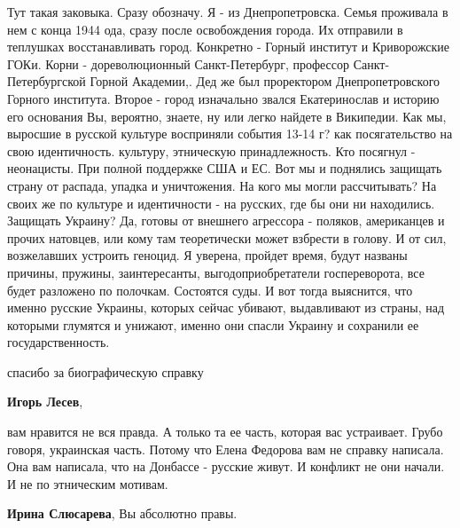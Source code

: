 \begin{itemize}
Тут такая заковыка. Сразу обозначу. Я - из Днепропетровска. Семья проживала в
нем с конца 1944 ода, сразу после освобождения города. Их отправили в теплушках
восстанавливать город. Конкретно - Горный институт и Криворожские ГОКи. Корни -
дореволюционный Санкт-Петербург, профессор Санкт-Петербургской Горной
Академии,. Дед же был проректором Днепропетровского Горного института. Второе -
город изначально звался Екатеринослав и историю его основания Вы, вероятно,
знаете, ну или легко найдете в Википедии. Как мы, выросшие в русской культуре
восприняли события 13-14 г? как посягательство на свою идентичность. культуру,
этническую принадлежность. Кто посягнул - неонацисты. При полной поддержке США
и ЕС. Вот мы и поднялись защищать страну от распада, упадка и уничтожения. На
кого мы могли рассчитывать? На своих же по культуре и идентичности - на
русских, где бы они ни находились. Защищать Украину? Да, готовы от внешнего
агрессора - поляков, американцев и прочих натовцев, или кому там теоретически
может взбрести в голову. И от сил, возжелавших устроить геноцид. Я уверена,
пройдет время, будут названы причины, пружины, заинтересанты,
выгодоприобретатели госпереворота, все будет разложено по полочкам. Состоятся
суды. И вот тогда выяснится, что именно русские Украины, которых сейчас
убивают, выдавливают из страны, над которыми глумятся и унижают, именно они
спасли Украину и сохранили ее государственность.

\begin{itemize} %
спасибо за биографическую справку

\textbf{Игорь Лесев}, 

вам нравится не вся правда. А только та ее часть, которая вас устраивает. Грубо
говоря, украинская часть. Потому что Елена Федорова вам не справку написала.
Она вам написала, что на Донбассе - русские живут. И конфликт не они начали. И
не по этническим мотивам.

\textbf{Ирина Слюсарева}, Вы абсолютно правы.
\end{itemize} %


\end{itemize} %
